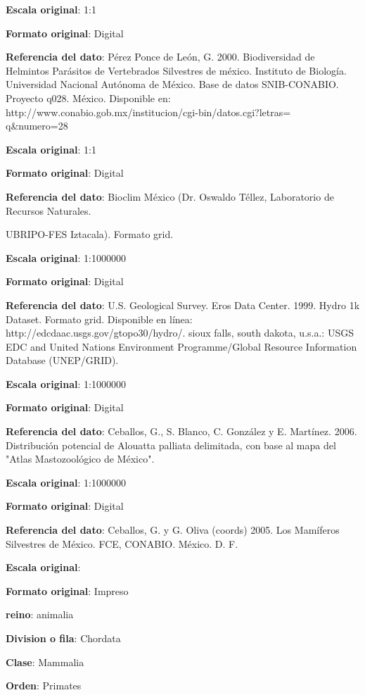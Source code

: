 \documentclass[twoside]{book}
\begin{document}
{{\textbf{Escala original}: 1:1

\textbf{Formato original}: Digital

\textbf{Referencia del dato}: Pérez Ponce de León, G. 2000. Biodiversidad de Helmintos Parásitos de Vertebrados Silvestres de méxico. Instituto de Biología. Universidad Nacional Autónoma de México. Base de datos SNIB-CONABIO. Proyecto q028. México. Disponible en: http://www.conabio.gob.mx/institucion/cgi-bin/datos.cgi?letras=\\q\&numero=28

\textbf{Escala original}: 1:1

\textbf{Formato original}: Digital

\textbf{Referencia del dato}: Bioclim México (Dr. Oswaldo Téllez, Laboratorio de Recursos Naturales.

UBRIPO-FES Iztacala). Formato grid.

\textbf{Escala original}: 1:1000000

\textbf{Formato original}: Digital

\textbf{Referencia del dato}: U.S. Geological Survey. Eros Data Center. 1999. Hydro 1k Dataset. Formato grid. Disponible en línea: http://edcdaac.usgs.gov/gtopo30/hydro/. sioux falls, south dakota, u.s.a.: USGS EDC and United Nations Environment Programme/Global Resource Information Database (UNEP/GRID).

\textbf{Escala original}: 1:1000000

\textbf{Formato original}: Digital

\textbf{Referencia del dato}: Ceballos, G., S. Blanco, C. González y E. Martínez. 2006. Distribución potencial de Alouatta palliata delimitada, con base al mapa del "Atlas Mastozoológico de México".

\textbf{Escala original}: 1:1000000

\textbf{Formato original}: Digital

\textbf{Referencia del dato}: Ceballos, G. y G. Oliva (coords) 2005. Los Mamíferos Silvestres de México. FCE, CONABIO. México. D. F.

\textbf{Escala original}:

\textbf{Formato original}: Impreso


\textbf{reino}: animalia

\textbf{Division o fila}: Chordata

\textbf{Clase}: Mammalia

\textbf{Orden}: Primates

}}
\end{document}
